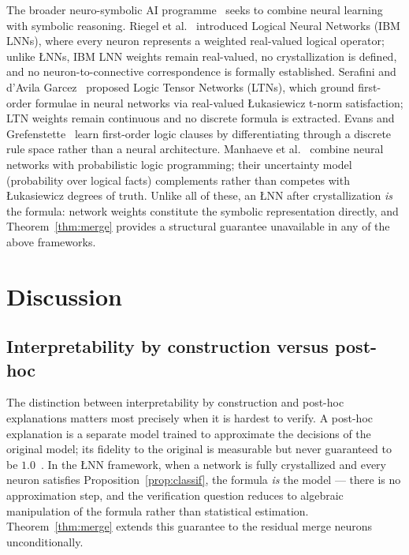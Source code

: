 \documentclass[lettersize,journal]{IEEEtran}
\newcommand{\LNN}{\L{}NN}
\begin{document}
The broader neuro-symbolic AI programme~\cite{garcez2019,garcez2023} seeks to
combine neural learning with symbolic reasoning.
Riegel et al.~\cite{riegel2020} introduced Logical Neural Networks (IBM LNNs),
where every neuron represents a weighted real-valued logical operator; unlike
\LNN{}s, IBM LNN weights remain real-valued, no crystallization is defined, and
no neuron-to-connective correspondence is formally established.
Serafini and d'Avila Garcez~\cite{serafini2016} proposed Logic Tensor Networks
(LTNs), which ground first-order formulae in neural networks via real-valued
\L{}ukasiewicz t-norm satisfaction; LTN weights remain continuous and no
discrete formula is extracted.
Evans and Grefenstette~\cite{evans2018} learn first-order logic clauses by
differentiating through a discrete rule space rather than a neural architecture.
Manhaeve et al.~\cite{manhaeve2018} combine neural networks with probabilistic
logic programming; their uncertainty model (probability over logical facts)
complements rather than competes with \L{}ukasiewicz degrees of truth.
Unlike all of these, an \LNN{} after crystallization \emph{is} the formula:
network weights constitute the symbolic representation directly, and
Theorem~\ref{thm:merge} provides a structural guarantee unavailable in any of
the above frameworks.

\section{Discussion}
\label{sec:discussion}

\subsection{Interpretability by construction versus post-hoc}

The distinction between interpretability by construction and post-hoc
explanations matters most precisely when it is hardest to verify.
A post-hoc explanation is a separate model trained to approximate the
decisions of the original model; its fidelity to the original is measurable
but never guaranteed to be $1.0$~\cite{guidotti2018}.
In the \LNN{} framework, when a network is fully crystallized and every neuron
satisfies Proposition~\ref{prop:classif}, the formula \emph{is} the model ---
there is no approximation step, and the verification question reduces to
algebraic manipulation of the formula rather than statistical estimation.
Theorem~\ref{thm:merge} extends this guarantee to the residual merge neurons
unconditionally.
\end{document}
